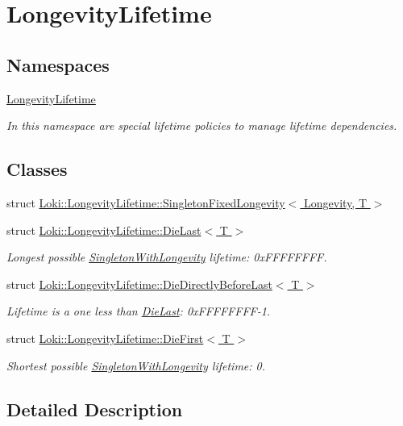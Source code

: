 \hypertarget{group__LongevityLifetimeGroup}{}\section{Longevity\+Lifetime}
\label{group__LongevityLifetimeGroup}
\subsection*{Namespaces}
\begin{DoxyCompactItemize}
\item 
 \hyperlink{namespaceLongevityLifetime}{Longevity\+Lifetime}
\begin{DoxyCompactList}\small\item\em In this namespace are special lifetime policies to manage lifetime dependencies. \end{DoxyCompactList}\end{DoxyCompactItemize}
\subsection*{Classes}
\begin{DoxyCompactItemize}
\item 
struct \hyperlink{classLoki_1_1LongevityLifetime_1_1SingletonFixedLongevity}{Loki\+::\+Longevity\+Lifetime\+::\+Singleton\+Fixed\+Longevity$<$ Longevity, T $>$}
\item 
struct \hyperlink{structLoki_1_1LongevityLifetime_1_1DieLast}{Loki\+::\+Longevity\+Lifetime\+::\+Die\+Last$<$ T $>$}
\begin{DoxyCompactList}\small\item\em Longest possible \hyperlink{classLoki_1_1SingletonWithLongevity}{Singleton\+With\+Longevity} lifetime\+: 0x\+F\+F\+F\+F\+F\+F\+F\+F. \end{DoxyCompactList}\item 
struct \hyperlink{structLoki_1_1LongevityLifetime_1_1DieDirectlyBeforeLast}{Loki\+::\+Longevity\+Lifetime\+::\+Die\+Directly\+Before\+Last$<$ T $>$}
\begin{DoxyCompactList}\small\item\em Lifetime is a one less than \hyperlink{structLoki_1_1LongevityLifetime_1_1DieLast}{Die\+Last}\+: 0x\+F\+F\+F\+F\+F\+F\+F\+F-\/1. \end{DoxyCompactList}\item 
struct \hyperlink{structLoki_1_1LongevityLifetime_1_1DieFirst}{Loki\+::\+Longevity\+Lifetime\+::\+Die\+First$<$ T $>$}
\begin{DoxyCompactList}\small\item\em Shortest possible \hyperlink{classLoki_1_1SingletonWithLongevity}{Singleton\+With\+Longevity} lifetime\+: 0. \end{DoxyCompactList}\end{DoxyCompactItemize}


\subsection{Detailed Description}
